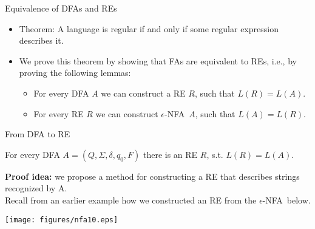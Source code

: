 \documentclass{prosper}%
\newcommand{\quiz}[1]{{\hfill \tiny{$_{ #1}$}}}
\newcommand{\enfa}{{$\epsilon$-NFA}}
\begin{document}
\begin{comment}
\begin{slide}{Exercise}
Matching REs and the shortest strings in the languages they specify. Assume $\Sigma=\{a,b\}$
\quiz{w3.4}
\end{slide}
\end{comment}

\begin{slide}{Equivalence of DFAs and REs}
\begin{itemize}
\item {\blue Theorem:} A language is regular if and only if some regular expression describes it. 
\item We prove this theorem by showing that FAs are equivalent to REs, i.e., by proving the following lemmas:
\begin{itemize}
\item For every DFA $A$ we can {\blue construct  a RE} $R$, such that $L(R) = L(A)$. 
\item For every RE $R$ we can {\blue construct \enfa}\ $A$, such that $L(A) = L(R)$.
\end{itemize} 
\end{itemize}
\end{slide}

\begin{slide}{From DFA to RE}
\begin{center}
For every DFA $A=(Q, \Sigma, \delta, q_0, F)$ there is an RE $R$, s.t. $L(R)=L(A)$.
\end{center}
{\bf Proof idea:} we propose a method for constructing a RE that describes strings recognized by A.
\vspace{1cm}\\
Recall from an earlier example how we constructed an RE from the \enfa\ below.
\begin{center}
\texttt{[image: figures/nfa10.eps]}
\end{center}
\end{slide}
\end{document}

